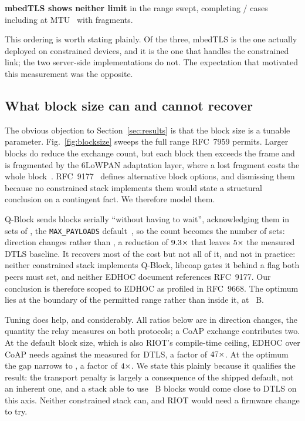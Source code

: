 \textbf{mbedTLS shows neither limit} in the range swept, completing
\numMbedtlsOk/\numMbedtlsTotal{} cases including \numMbedtlsAtFrame{} at
MTU~\numFramePayload{} with \numMbedtlsMaxFrag{} fragments.

This ordering is worth stating plainly. Of the three, mbedTLS is the one actually deployed on
constrained devices, and it is the one that handles the constrained link; the two
server-side implementations do not. The expectation that motivated this measurement was the
opposite.

\subsection{What block size can and cannot recover}
\label{sec:blocksize}

The obvious objection to Section~\ref{sec:results} is that the block size is a tunable
parameter. Fig.~\ref{fig:blocksize} sweeps the full range RFC~7959 permits. Larger blocks do
reduce the exchange count, but each block then exceeds the frame and is fragmented by the
6LoWPAN adaptation layer, where a lost fragment costs the whole block~\cite{rfc4944,rfc6282}. RFC~9177~\cite{rfc9177} defines
alternative block options, and dismissing them because no constrained stack implements them
would state a structural conclusion on a contingent fact. We therefore model them.

Q-Block sends blocks serially ``without having to wait'', acknowledging them in sets of
\numQBlockMaxPayloads{}, the \texttt{MAX\_PAYLOADS} default~\cite{rfc9177}, so the count
becomes the number of sets: \numDirQBlock{} direction changes rather than \numDirDefault{},
a reduction of $9.3\times$ that leaves $5\times$ the measured DTLS
baseline. It recovers most of the cost but not all of it, and not in practice:
neither constrained stack implements Q-Block, libcoap gates it behind a flag both peers must
set, and neither EDHOC document references RFC~9177. Our conclusion is therefore scoped to
EDHOC as profiled in RFC~9668. The optimum lies at the
boundary of the permitted range rather than inside it, at \numBestBlock~B.

Tuning does help, and considerably. All ratios below are in direction changes, the quantity
the relay measures on both protocols; a CoAP exchange contributes two. At the default block
size, which is also RIOT's compile-time ceiling, EDHOC over CoAP needs \numDirDefault{}
against the \numDtlsMeasTurns{} measured for DTLS, a factor of $47\times$. At
the optimum the gap narrows to \numDirBest{}, a factor of $4\times$. We state this plainly because it
qualifies the result: the transport penalty is largely a consequence of the shipped default,
not an inherent one, and a stack able to use \numBestBlock~B blocks would come close to DTLS
on this axis. Neither constrained stack can, and RIOT would need a firmware change to try.

